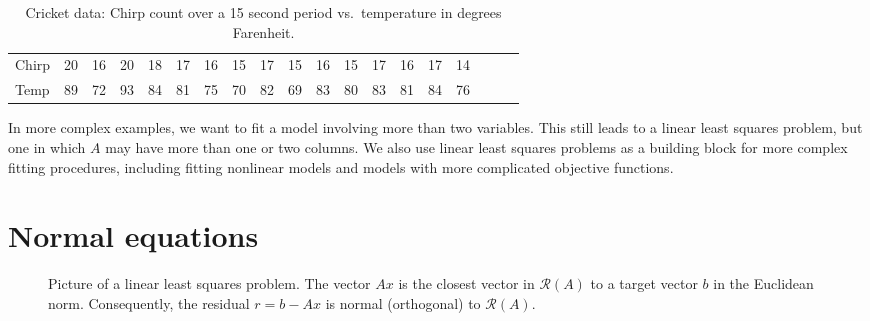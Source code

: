\documentclass[12pt, leqno]{article} %
\begin{document}
\begin{table}
  \small
  \begin{tabular}{l|cccccccccccccccccc}
    Chirp &
    20& 16& 20& 18& 17& 16& 15& 17& 15& 16& 15& 17& 16& 17& 14 \\
    Temp &
    89& 72& 93& 84& 81& 75& 70& 82& 69& 83& 80& 83& 81& 84& 76
  \end{tabular}
  \caption{Cricket data: Chirp count over a 15 second period vs.~temperature
    in degrees Farenheit.}
  \label{table1}
\end{table}

In more complex examples, we want to fit a model involving more than
two variables.  This still leads to a linear least squares problem,
but one in which $A$ may have more than one or two columns.
We also use linear least squares
problems as a building block for more complex fitting procedures,
including fitting nonlinear models and models with more complicated
objective functions.

\section{Normal equations}

\begin{figure}
  \begin{center}
  \end{center}
  \caption{Picture of a linear least squares problem.  The vector $Ax$
           is the closest vector in $\mathcal{R}(A)$ to a target
           vector $b$ in the Euclidean norm.  Consequently, the
           residual $r = b-Ax$ is normal (orthogonal) to
           $\mathcal{R}(A)$.}
  \label{fig1}
\end{figure}
\end{document}
